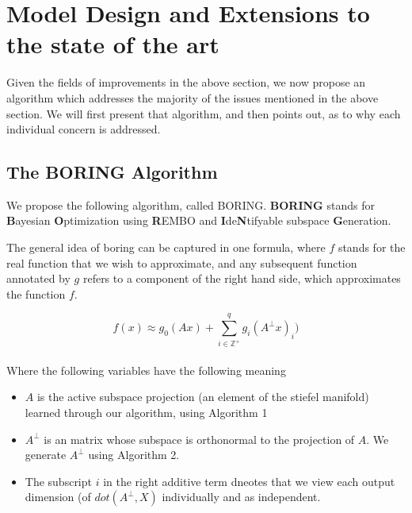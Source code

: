\chapter{Model Design and Extensions to the state of the art}

\ifpdf
    \graphicspath{{Chapter4/Figs/Raster/}{Chapter4/Figs/PDF/}{Chapter4/Figs/}}
\else
    \graphicspath{{Chapter4/Figs/Vector/}{Chapter4/Figs/}}
\fi

Given the fields of improvements in the above section, we now propose an algorithm which addresses the majority of the issues mentioned in the above section.
We will first present that algorithm, and then points out, as to why each individual concern is addressed.

\section{The BORING Algorithm}

We propose the following algorithm, called BORING. \textbf{BORING} stands for \textbf{B}ayesian \textbf{O}ptimization using \textbf{R}EMBO and \textbf{I}de\textbf{N}tifyable subspace \textbf{G}eneration.

The general idea of boring can be captured in one formula, where $f$ stands for the real function that we wish to approximate, and any subsequent function annotated by $g$ refers to a component of the right hand side, which approximates the function $f$.

\begin{equation}
f(x) \approx g_0(A x) + \sum_{i \in \mathbb{Z}^+}^{q} g_i( A^{\bot} x)_i )
\label{eq:dimRedEquation}
\end{equation} \\

Where the following variables have the following meaning
\begin{itemize}
\item $A$ is the active subspace projection (an element of the stiefel manifold) learned through our algorithm, using Algorithm 1
\item $A^{\bot}$ is an matrix whose subspace is orthonormal to the projection of $A$.
We generate $A^{\bot}$ using Algorithm 2.
\item The subscript $i$ in the right additive term dneotes that we view each output dimension (of $dot(A^{\bot}, X)$ individually and as independent.

\end{itemize}

